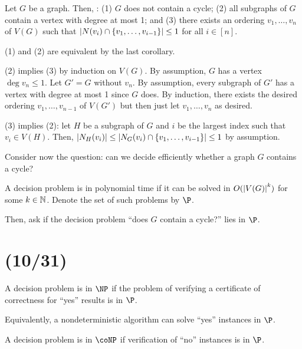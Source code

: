 \documentclass[class=math239,notes,tikz]{agony}
\begin{document}
\begin{corollary}\label{cor:464-neg}
  Let $G$ be a graph. Then, \Tfae:
  (1) $G$ does not contain a cycle;
  (2) all subgraphs of $G$ contain a vertex with degree at most 1; and
  (3) there exists an ordering $v_1,\dotsc,v_n$ of $V(G)$ such that
  $\abs{N(v_i) \cap \{v_1,\dotsc,v_{i-1}\}} \leq 1$ for all $i \in [n]$.
\end{corollary}
\begin{prf}
  (1) and (2) are equivalent by the last corollary.

  (2) implies (3) by induction on $V(G)$.
  By assumption, $G$ has a vertex $\deg v_n \leq 1$.
  Let $G' = G$ without $v_n$.
  By assumption, every subgraph of $G'$ has a vertex with degree at most 1 since $G$ does.
  By induction, there exists the desired ordering $v_1,\dotsc,v_{n-1}$ of $V(G')$
  but then just let $v_1,\dotsc,v_n$ as desired.

  (3) implies (2): let $H$ be a subgraph of $G$
  and $i$ be the largest index such that $v_i \in V(H)$.
  Then, $\abs{N_H(v_i)} \leq \abs{N_G(v_i) \cap \{v_1,\dotsc,v_{i-1}\}} \leq 1$
  by assumption.
\end{prf}

Consider now the question: can we decide efficiently whether a graph $G$ contains a cycle?

\begin{defn}
  A decision problem is in polynomial time if it can be solved in
  $O(\abs{V(G)}^k)$ for some $k \in \mathbb{N}$.
  Denote the set of such problems by $\P$.
\end{defn}

Then, ask if the decision problem ``does $G$ contain a cycle?'' lies in $\P$.

\section{(10/31)}

\begin{defn}
  A decision problem is in $\NP$ if the problem of verifying
  a certificate of correctness for ``yes'' results is in $\P$.

  Equivalently, a nondeterministic algorithm can solve ``yes'' instances in $\P$.
\end{defn}
\begin{defn}
  A decision problem is in $\coNP$ if verification of ``no'' instances is in $\P$.
\end{defn}
\end{document}
